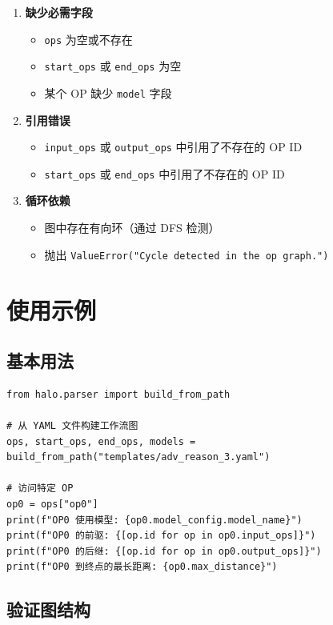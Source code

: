 \documentclass[12pt,a4paper]{article}
\begin{document}
\begin{enumerate}
    \item \textbf{缺少必需字段}
    \begin{itemize}
        \item \texttt{ops} 为空或不存在
        \item \texttt{start\_ops} 或 \texttt{end\_ops} 为空
        \item 某个 OP 缺少 \texttt{model} 字段
    \end{itemize}
    
    \item \textbf{引用错误}
    \begin{itemize}
        \item \texttt{input\_ops} 或 \texttt{output\_ops} 中引用了不存在的 OP ID
        \item \texttt{start\_ops} 或 \texttt{end\_ops} 中引用了不存在的 OP ID
    \end{itemize}
    
    \item \textbf{循环依赖}
    \begin{itemize}
        \item 图中存在有向环（通过 DFS 检测）
        \item 抛出 \texttt{ValueError("Cycle detected in the op graph.")}
    \end{itemize}
\end{enumerate}

\section{使用示例}

\subsection{基本用法}

\begin{lstlisting}
from halo.parser import build_from_path

# 从 YAML 文件构建工作流图
ops, start_ops, end_ops, models = build_from_path("templates/adv_reason_3.yaml")

# 访问特定 OP
op0 = ops["op0"]
print(f"OP0 使用模型: {op0.model_config.model_name}")
print(f"OP0 的前驱: {[op.id for op in op0.input_ops]}")
print(f"OP0 的后继: {[op.id for op in op0.output_ops]}")
print(f"OP0 到终点的最长距离: {op0.max_distance}")
\end{lstlisting}

\subsection{验证图结构}
\end{document}
